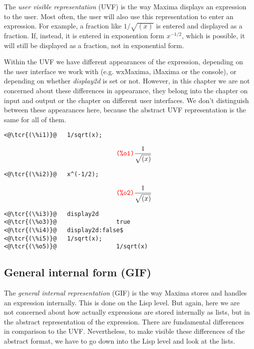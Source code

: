 \documentclass[../Maxima_Workbook.tex]{subfiles}
\begin{document}
The \emph{user visible representation} (UVF) is the way Maxima displays an expression to the user. Most often, the user will also use this representation to enter an expression. For example, a fraction like $ 1/\sqrt{(x)} $ is entered and displayed as a fraction. If,  instead, it is entered in exponention form $ x^{-1/2} $, which is possible, it will still be displayed as a fraction, not in exponential form.

\lz Within the UVF we have different appearances of the expression, depending on the user interface we work with (e.g. wxMaxima, iMaxima or the console), or depending on whether \emph{display2d} is set or not. However, in this chapter we are not concerned about these differences in appearance, they belong into the chapter on input and output or the chapter on different user interfaces. We don't distinguish between these appearances here, because the abstract UVF representation is the same for all of them.

\lz \begin{small}
\color{blue} \leqn
\begin{lstlisting}
<@\tcr{(\%i1)}@   1/sqrt(x);
\end{lstlisting}
\vspace{-4mm} \[\tag*{\tcr{\ttfamily (\%o1)}} \frac{1}{\sqrt{(x)}} \]
\vspace{-5mm} \begin{lstlisting}
<@\tcr{(\%i2)}@   x^(-1/2);
\end{lstlisting}
\vspace{-4mm} \[\tag*{\tcr{\ttfamily (\%o2)}} \frac{1}{\sqrt{(x)}}  \]
\vspace{-5mm} \begin{lstlisting}
<@\tcr{(\%i3)}@   display2d
<@\tcr{(\%o3)}@			        true
<@\tcr{(\%i4)}@   display2d:false$
<@\tcr{(\%i5)}@   1/sqrt(x);
<@\tcr{(\%o5)}@			        1/sqrt(x)
\end{lstlisting}
\color{black} \reqn
\end{small}

\subsection{General internal form (GIF)} 

The \emph{general internal representation} (GIF) is the way Maxima stores and handles an expression internally. This is done on the Lisp level. But again, here we are not concerned about how actually expressions are stored internally as lists, but in the abstract representation of the expression. There are fundamental differences in comparison to the UVF. Nevertheless, to make visible these differences of the abstract format, we have to go down into the Lisp level and look at the lists.
\end{document}
